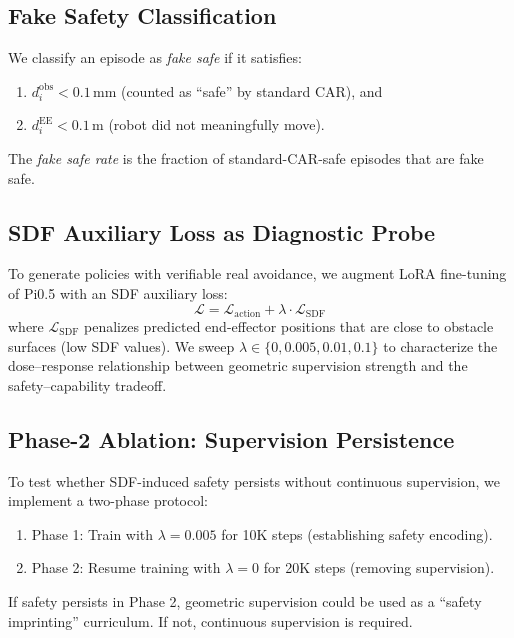 \documentclass[10pt,twocolumn]{article}
\begin{document}
\subsection{Fake Safety Classification}

We classify an episode as \emph{fake safe} if it satisfies:
\begin{enumerate}
    \item $d_i^{\text{obs}} < 0.1$\,mm (counted as ``safe'' by standard CAR), and
    \item $d_i^{\text{EE}} < 0.1$\,m (robot did not meaningfully move).
\end{enumerate}
The \emph{fake safe rate} is the fraction of standard-CAR-safe episodes that are fake safe.

\subsection{SDF Auxiliary Loss as Diagnostic Probe}

To generate policies with verifiable real avoidance, we augment LoRA fine-tuning of Pi0.5 with an SDF auxiliary loss:
\begin{equation}
    \mathcal{L} = \mathcal{L}_{\text{action}} + \lambda \cdot \mathcal{L}_{\text{SDF}}
\end{equation}
where $\mathcal{L}_{\text{SDF}}$ penalizes predicted end-effector positions that are close to obstacle surfaces (low SDF values). We sweep $\lambda \in \{0, 0.005, 0.01, 0.1\}$ to characterize the dose--response relationship between geometric supervision strength and the safety--capability tradeoff.

\subsection{Phase-2 Ablation: Supervision Persistence}

To test whether SDF-induced safety persists without continuous supervision, we implement a two-phase protocol:
\begin{enumerate}
    \item Phase 1: Train with $\lambda = 0.005$ for 10K steps (establishing safety encoding).
    \item Phase 2: Resume training with $\lambda = 0$ for 20K steps (removing supervision).
\end{enumerate}
If safety persists in Phase 2, geometric supervision could be used as a ``safety imprinting'' curriculum. If not, continuous supervision is required.
\end{document}
